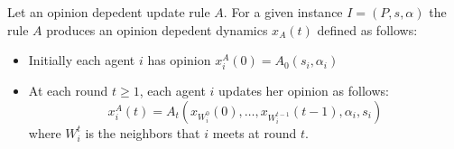 \begin{definition}\label{d:opinion_dependent_dynamics}
Let an opinion depedent update rule $A$. For a given instance $I=(P,s,\alpha)$
the rule $A$ produces an opinion depedent dynamics $x_A(t)$ defined as follows:
\begin{itemize}
 \item Initially each agent $i$ has opinion $x_i^A(0)=A_0(s_i,\alpha_i)$
 \item At each round $t\geq 1$, each agent $i$ updates her opinion as follows:
 \[x_i^A(t)=A_t(x_{W_i^0}(0),\dots,x_{W_i^{t-1}}(t-1),\alpha_i,s_i)\]
where $W_i^t$ is the neighbors that $i$ meets at round $t$.
\end{itemize}
\end{definition}



